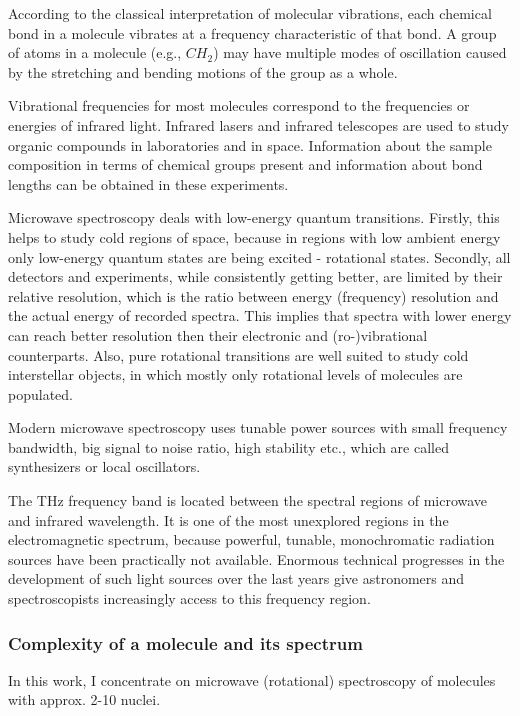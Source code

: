 According to the classical interpretation of molecular vibrations, each chemical bond in a molecule vibrates at a frequency characteristic of that bond. A group of atoms in a molecule (e.g., $CH_2$) may have multiple modes of oscillation caused by the stretching and bending motions of the group as a whole. 

Vibrational frequencies for most molecules correspond to the frequencies or energies of infrared light. Infrared lasers and infrared telescopes are used to study organic compounds in laboratories and in space. Information about the sample composition in terms of chemical groups present and information about bond lengths can be obtained in these experiments. 

Microwave spectroscopy deals with low-energy quantum transitions. Firstly, this helps to study cold regions of space, because in regions with low ambient energy only low-energy quantum states are being excited - rotational states. Secondly, all detectors and experiments, while consistently getting better, are limited by their relative resolution, which is the ratio between energy (frequency) resolution and the actual energy of recorded spectra. This implies that spectra with lower energy can reach better resolution then their electronic and (ro-)vibrational counterparts. Also, pure rotational transitions are well suited to study cold interstellar objects, in which mostly only rotational levels of molecules are populated. 

Modern microwave spectroscopy uses tunable power sources with small frequency bandwidth, big signal to noise ratio, high stability etc., which are called synthesizers or local oscillators.

The THz frequency band is located between the spectral regions of microwave and infrared wavelength. It is one of the most unexplored regions in the electromagnetic spectrum, because powerful, tunable, monochromatic radiation sources have been practically not available. Enormous technical progresses in the development of such light sources over the last years give astronomers and spectroscopists increasingly access to this frequency region. 


\subsubsection{Complexity of a molecule and its spectrum}

In this work, I concentrate on microwave (rotational) spectroscopy of molecules with approx. 2-10 nuclei. 

